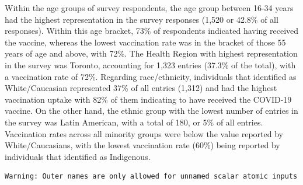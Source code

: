 \documentclass[
  letterpaper,
  DIV=11,
  numbers=noendperiod]{scrartcl}
\begin{document}
Within the age groups of survey respondents, the age group between 16-34
years had the highest representation in the survey responses (1,520 or
42.8\% of all responses). Within this age bracket, 73\% of respondents
indicated having received the vaccine, whereas the lowest vaccination
rate was in the bracket of those 55 years of age and above, with 72\%.
The Health Region with highest representation in the survey was Toronto,
accounting for 1,323 entries (37.3\% of the total), with a vaccination
rate of 72\%. Regarding race/ethnicity, individuals that identified as
White/Caucasian represented 37\% of all entries (1,312) and had the
highest vaccination uptake with 82\% of them indicating to have received
the COVID-19 vaccine. On the other hand, the ethnic group with the
lowest number of entries in the survey was Latin American, with a total
of 180, or 5\% of all entries. Vaccination rates across all minority
groups were below the value reported by White/Caucasians, with the
lowest vaccination rate (60\%) being reported by individuals that
identified as Indigenous.

\begin{verbatim}
Warning: Outer names are only allowed for unnamed scalar atomic inputs
\end{verbatim}
\end{document}
